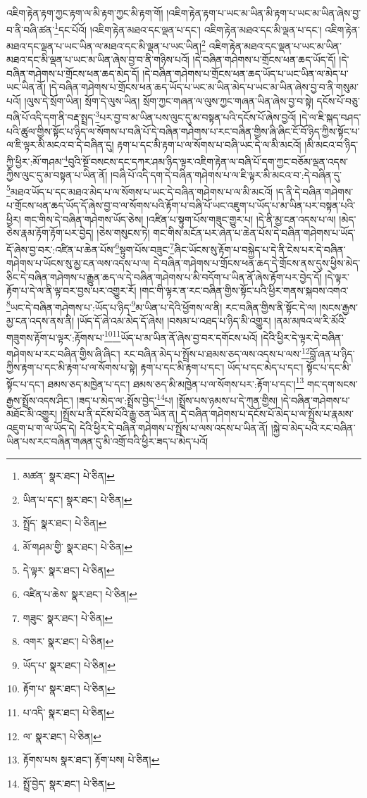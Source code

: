 འཇིག་རྟེན་རྟག་ཀྱང་རྟག་ལ་མི་རྟག་ཀྱང་མི་རྟག་གོ། །འཇིག་རྟེན་རྟག་པ་ཡང་མ་ཡིན་མི་རྟག་པ་ཡང་མ་ཡིན་ཞེས་བྱ་བ་ནི་བཞི་ཚན་\footnote{མཚན་  སྣར་ཐང་།  པེ་ཅིན། }དང་པོའོ། །འཇིག་རྟེན་མཐའ་དང་ལྡན་པ་དང་། འཇིག་རྟེན་མཐའ་དང་མི་ལྡན་པ་དང་། འཇིག་རྟེན་མཐའ་དང་ལྡན་པ་ཡང་ཡིན་ལ་མཐའ་དང་མི་ལྡན་པ་ཡང་ཡིན།\footnote{ཡིན་པ་དང་།  སྣར་ཐང་།  པེ་ཅིན། } འཇིག་རྟེན་མཐའ་དང་ལྡན་པ་ཡང་མ་ཡིན་མཐའ་དང་མི་ལྡན་པ་ཡང་མ་ཡིན་ཞེས་བྱ་བ་ནི་གཉིས་པའོ། །དེ་བཞིན་གཤེགས་པ་གྲོངས་ཕན་ཆད་ཡོད་དོ། །དེ་བཞིན་གཤེགས་པ་གྲོངས་ཕན་ཆད་མེད་དོ། །དེ་བཞིན་གཤེགས་པ་གྲོངས་ཕན་ཆད་ཡོད་པ་ཡང་ཡིན་ལ་མེད་པ་ཡང་ཡིན་ནོ། །དེ་བཞིན་གཤེགས་པ་གྲོངས་ཕན་ཆད་ཡོད་པ་ཡང་མ་ཡིན་མེད་པ་ཡང་མ་ཡིན་ཞེས་བྱ་བ་ནི་གསུམ་པའོ། །ལུས་དེ་སྲོག་ཡིན། སྲོག་དེ་ལུས་ཡིན། སྲོག་ཀྱང་གཞན་ལ་ལུས་ཀྱང་གཞན་ཡིན་ཞེས་བྱ་བ་སྟེ། དངོས་པོ་བཅུ་བཞི་པོ་འདི་དག་ནི་བརྡ་སྤྲད་\footnote{སྤྲོད་  སྣར་ཐང་།  པེ་ཅིན། }པར་བྱ་བ་མ་ཡིན་པས་ལུང་དུ་མ་བསྟན་པའི་དངོས་པོ་ཞེས་བྱའོ། །དེ་ལ་ཇི་སྐད་བཤད་པའི་ཚུལ་གྱིས་སྟོང་པ་ཉིད་ལ་སོགས་པ་བཞི་པོ་དེ་བཞིན་གཤེགས་པ་རང་བཞིན་གྱིས་ཞི་ཞིང་ངོ་བོ་ཉིད་ཀྱིས་སྟོང་པ་ལ་ཇི་ལྟར་མི་མངའ་བ་དེ་བཞིན་དུ། རྟག་པ་དང་མི་རྟག་པ་ལ་སོགས་པ་བཞི་ཡང་དེ་ལ་མི་མངའོ། །མི་མངའ་བ་ཉིད་ཀྱི་ཕྱིར་:མོ་གཤམ་\footnote{མོ་གཤམ་གྱི་  སྣར་ཐང་།  པེ་ཅིན། }བུའི་སྔོ་བསངས་དང་དཀར་ཤམ་ཉིད་ལྟར་འཇིག་རྟེན་ལ་བཞི་པོ་དག་ཀྱང་བཅོམ་ལྡན་འདས་ཀྱིས་ལུང་དུ་མ་བསྟན་པ་ཡིན་ནོ། །བཞི་པོ་འདི་དག་དེ་བཞིན་གཤེགས་པ་ལ་ཇི་ལྟར་མི་མངའ་བ་:དེ་བཞིན་དུ་\footnote{དེ་ལྟར་  སྣར་ཐང་།  པེ་ཅིན། }མཐའ་ཡོད་པ་དང་མཐའ་མེད་པ་ལ་སོགས་པ་ཡང་དེ་བཞིན་གཤེགས་པ་ལ་མི་མངའོ། །ད་ནི་དེ་བཞིན་གཤེགས་པ་གྲོངས་ཕན་ཆད་ཡོད་དོ་ཞེས་བྱ་བ་ལ་སོགས་པའི་རྟོག་པ་བཞི་པོ་ཡང་འཇུག་པ་ཡོད་པ་མ་ཡིན་པར་བསྟན་པའི་ཕྱིར། གང་གིས་དེ་བཞིན་གཤེགས་ཡོད་ཅེས། །འཛིན་པ་སྟུག་པོས་གཟུང་གྱུར་པ། །དེ་ནི་མྱ་ངན་འདས་པ་ལ། །མེད་ཅེས་རྣམ་རྟོག་རྟོག་པར་བྱེད། །ཅེས་གསུངས་ཏེ། གང་གིས་མངོན་པར་ཞེན་པ་ཆེན་པོས་དེ་བཞིན་གཤེགས་པ་ཡོད་དོ་ཞེས་བྱ་བར་:འཛིན་པ་ཆེན་པོས་\footnote{འཛིན་པ་ཆེས་  སྣར་ཐང་།  པེ་ཅིན། }སྟུག་པོས་བཟུང་\footnote{གཟུང་  སྣར་ཐང་།  པེ་ཅིན། }ཞིང་ཡོངས་སུ་རྟོག་པ་བསྐྱེད་པ་དེ་ནི་ངེས་པར་དེ་བཞིན་གཤེགས་པ་ཡོངས་སུ་མྱ་ངན་ལས་འདས་པ་ལ། དེ་བཞིན་གཤེགས་པ་གྲོངས་ཕན་ཆད་དེ་གྲོངས་ནས་དུས་ཕྱིས་མེད་ཅིང་དེ་བཞིན་གཤེགས་པ་རྒྱུན་ཆད་ལ་དེ་བཞིན་གཤེགས་པ་མི་བདོག་པ་ཡིན་ནོ་ཞེས་རྟོག་པར་བྱེད་དོ། །དེ་ལྟར་རྟོག་པ་དེ་ལ་ནི་ལྟ་བར་བྱས་པར་འགྱུར་རོ། །གང་གི་ལྟར་ན་རང་བཞིན་གྱིས་སྟོང་པའི་ཕྱིར་གནས་སྐབས་འགའ་\footnote{འགར་  སྣར་ཐང་།  པེ་ཅིན། }ཡང་དེ་བཞིན་གཤེགས་པ་:ཡོད་པ་ཉིད་\footnote{ཡོད་པ་  སྣར་ཐང་།  པེ་ཅིན། }མ་ཡིན་པ་དེའི་ཕྱོགས་ལ་ནི། རང་བཞིན་གྱིས་ནི་སྟོང་དེ་ལ། །སངས་རྒྱས་མྱ་ངན་འདས་ནས་ནི། །ཡོད་དོ་ཞེ་འམ་མེད་དོ་ཞེས། །བསམ་པ་འཐད་པ་ཉིད་མི་འགྱུར། །ནམ་མཁའ་ལ་རི་མོའི་གཟུགས་རྟོག་པ་ལྟར་:རྟོགས་པ་\footnote{རྟོག་པ་  སྣར་ཐང་།  པེ་ཅིན། }\footnote{པ་འདི་  སྣར་ཐང་།  པེ་ཅིན། }ཡོད་པ་མ་ཡིན་ནོ་ཞེས་བྱ་བར་དགོངས་པའོ། །དེའི་ཕྱིར་དེ་ལྟར་དེ་བཞིན་གཤེགས་པ་རང་བཞིན་གྱིས་ཞི་ཞིང་། རང་བཞིན་མེད་པ་སྤྲོས་པ་ཐམས་ཅད་ལས་འདས་པ་ལས་\footnote{ལ་  སྣར་ཐང་།  པེ་ཅིན། }བློ་ཞན་པ་ཉིད་ཀྱིས་རྟག་པ་དང་མི་རྟག་པ་ལ་སོགས་པ་སྟེ། རྟག་པ་དང་མི་རྟག་པ་དང་། ཡོད་པ་དང་མེད་པ་དང་། སྟོང་པ་དང་མི་སྟོང་པ་དང་། ཐམས་ཅད་མཁྱེན་པ་དང་། ཐམས་ཅད་མི་མཁྱེན་པ་ལ་སོགས་པར་:རྟོག་པ་དང་།\footnote{རྟོགས་པས  སྣར་ཐང་། རྟོག་པས།  པེ་ཅིན། } གང་དག་སངས་རྒྱས་སྤྲོས་འདས་ཤིང་། །ཟད་པ་མེད་ལ་:སྤྲོས་བྱེད་\footnote{སྤྲོ་བྱེད་  སྣར་ཐང་།  པེ་ཅིན། }པ། །སྤྲོས་པས་ཉམས་པ་དེ་ཀུན་གྱིས། །དེ་བཞིན་གཤེགས་པ་མཐོང་མི་འགྱུར། །སྤྲོས་པ་ནི་དངོས་པོའི་རྒྱུ་ཅན་ཡིན་ན། དེ་བཞིན་གཤེགས་པ་དངོས་པོ་མེད་པ་ལ་སྤྲོས་པ་རྣམས་འཇུག་པ་ག་ལ་ཡོད་དེ། དེའི་ཕྱིར་དེ་བཞིན་གཤེགས་པ་སྤྲོས་པ་ལས་འདས་པ་ཡིན་ནོ། །སྐྱེ་བ་མེད་པའི་རང་བཞིན་ཡིན་པས་རང་བཞིན་གཞན་དུ་མི་འགྲོ་བའི་ཕྱིར་ཟད་པ་མེད་པའོ། 